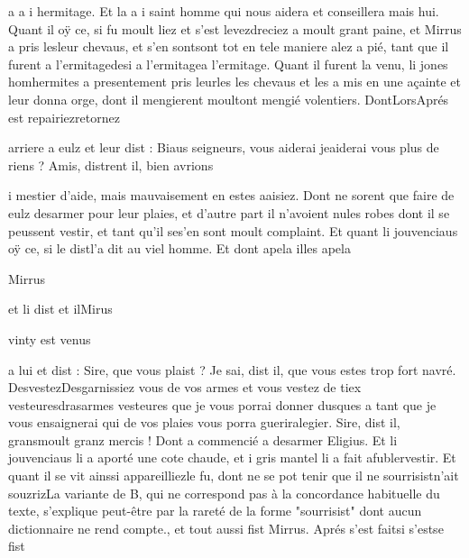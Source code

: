 \documentclass{article}
\begin{document}
\begin{pages}
                     a a i
                  hermitage. Et la a i
                  saint homme qui nous aidera et conseillera mais
                     hui. Quant il oÿ ce, si fu moult liez et s’est 
                  levezdreciez a moult grant paine, et Mirrus a pris 
                  lesleur chevaus, et s’en 
                  sontsont tot en tele maniere alez a pié, 
                  tant que il furent a l’ermitagedesi a l'ermitagea l'ermitage. \pend
            \pstart Quant il furent la venu, li jones 
                     homhermites a 
                  presentement pris 
                  leurles les chevaus et les a mis en une açainte et leur donna orge, 
                  dont il 
                        mengierent moultont mengié volentiers. 
                  DontLorsAprés est 
                  repairiezretornez
               
                  arriere a eulz et leur dist : Biaus seigneurs, 
                     vous aiderai jeaiderai vous plus de riens ?
               Amis, distrent il, bien avrions 
                     
                     i mestier d’aide, mais mauvaisement en estes aaisiez. Dont ne sorent
               que faire de eulz desarmer pour leur plaies, et d’autre part il n’avoient nules robes
               dont il se peussent vestir, et tant qu’il 
                  ses'en sont moult complaint. Et quant li jouvenciaus oÿ ce, si 
                  le distl'a dit au viel homme. Et dont 
                  apela illes apela
               
                  Mirrus
               
                  et li dist et 
                  ilMirus
               
                  vinty est venus
               
                  a lui et dist : Sire, que vous plaist ? Je sai,
                  dist il, que vous estes 
                     trop fort navré. 
                     DesvestezDesgarnissiez vous de vos armes et vous vestez de tiex 
                     vesteuresdrasarmes
                        vesteures que je vous porrai donner dusques a tant que je vous ensaignerai qui de vos
                  plaies vous porra 
                     gueriralegier.
               Sire, dist il, 
                     gransmoult granz mercis ! Dont a commencié a desarmer Eligius. Et li
                  jouvenciaus li a aporté une cote chaude, et i gris mantel li a
               fait 
                  afublervestir. Et quant il 
                  se vit ainssi appareilliezle fu, dont ne se pot tenir que il 
                  ne sourrisistn'ait souzrizLa variante de B, qui ne correspond pas à la
                  concordance habituelle du texte, s'explique peut-être par la rareté de la forme
                  "sourrisist" dont aucun dictionnaire ne rend compte., et tout aussi fist
                  Mirrus. Aprés 
                  s’est faitsi s'estse fist
               

\end{pages}
\end{document}
